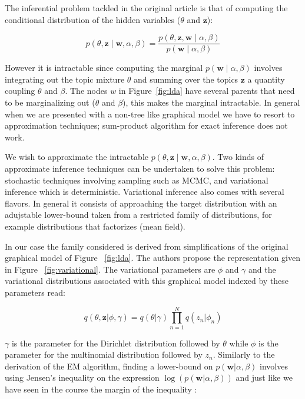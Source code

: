 \documentclass[12pt,a4paper,onecolumn]{article}
\begin{document}
The inferential problem tackled in the original article is that of computing the conditional distribution of the hidden variables ($\theta$ and $\mathbf{z}$):

$$p(\theta, \mathbf{z} \mid \mathbf{w}, \alpha, \beta) = \frac{p(\theta, \mathbf{z}, \mathbf{w} \mid \alpha, \beta)}{p(\mathbf{w} \mid \alpha, \beta)}$$

However it is intractable since computing the marginal $p(\mathbf{w} \mid \alpha, \beta)$ involves integrating out the topic mixture $\theta$ and summing over the topics $\mathbf{z}$ a quantity coupling $\theta$ and $\beta$. The nodes $w$ in Figure~\ref{fig:lda} have several parents that need to be marginalizing out ($\theta$ and $\beta$), this makes the marginal intractable. In general when we are presented with a non-tree like graphical model we have to resort to approximation techniques; sum-product algorithm for exact inference does not work.

We wish to approximate the intractable $p(\theta, \mathbf{z} \mid \mathbf{w}, \alpha, \beta)$. Two kinds of approximate inference techniques can be undertaken to solve this problem: stochastic techniques involving sampling such as MCMC, and variational inference which is deterministic. Variational inference also comes with several flavors. In general it consists of approaching the target distribution with an adujstable lower-bound taken from a restricted family of distributions, for example distributions that factorizes (mean field).

In our case the family considered is derived from simplifications of the original graphical model of Figure ~\ref{fig:lda}. The authors propose the representation given in Figure ~\ref{fig:variational}. The variational parameters are $\phi$ and $\gamma$ and the variational distributions associated with this graphical model indexed by these parameters read:

\begin{equation*}
	q(\theta, \mathbf{z}|\phi, \gamma) = q(\theta|\gamma)\prod_{n=1}^N q(z_n|\phi_n)
\end{equation*}


$\gamma$ is the parameter for the Dirichlet distribution followed by $\theta$ while $\phi$ is the parameter for the multinomial distribution followed by $z_n$. Similarly to the derivation of the EM algorithm, finding a lower-bound on $p(\mathbf{w}|\alpha, \beta)$ involves using Jensen's inequality on the expression $\log (p(\mathbf{w}|\alpha, \beta))$ and just like we have seen in the course the margin of the inequality :
\end{document}
